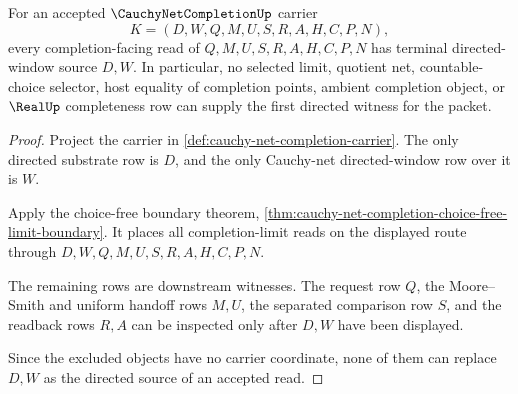 \begin{theorem}
\label{thm:cauchy-net-completion-directed-window-terminality}
For an accepted $\CauchyNetCompletionUp$ carrier
$$
K=(D,W,Q,M,U,S,R,A,H,C,P,N),
$$
every completion-facing read of $Q,M,U,S,R,A,H,C,P,N$ has terminal directed-window source $D,W$. In particular, no selected limit, quotient net, countable-choice selector, host equality of completion points, ambient completion object, or $\RealUp$ completeness row can supply the first directed witness for the packet.
\end{theorem}
\begin{proof}
Project the carrier in \autoref{def:cauchy-net-completion-carrier}. The only directed substrate row is $D$, and the only Cauchy-net directed-window row over it is $W$.

Apply the choice-free boundary theorem, \autoref{thm:cauchy-net-completion-choice-free-limit-boundary}. It places all completion-limit reads on the displayed route through $D,W,Q,M,U,S,R,A,H,C,P,N$.

The remaining rows are downstream witnesses. The request row $Q$, the Moore--Smith and uniform handoff rows $M,U$, the separated comparison row $S$, and the readback rows $R,A$ can be inspected only after $D,W$ have been displayed.

Since the excluded objects have no carrier coordinate, none of them can replace $D,W$ as the directed source of an accepted read.
\end{proof}

